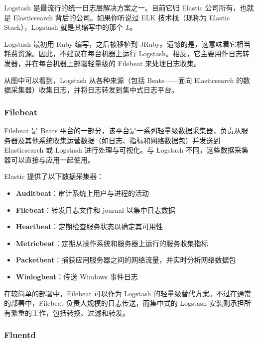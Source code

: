 \label{idx:1854}
\label{idx:1855}
Logstash 是最流行的统一日志层解决方案之一。目前它归 Elastic 公司所有，也就是 Elasticsearch 背后的公司。如果你听说过 ELK 技术栈（现称为 Elastic Stack），Logstash 就是其缩写中的那个 \emph{L}。

Logstash 最初用 Ruby 编写，之后被移植到 JRuby。遗憾的是，这意味着它相当耗费资源。因此，不建议在每台机器上运行 Logstash。相反，它主要用作日志转发器，并在每台机器上部署轻量级的 Filebeat 来处理日志收集。


\label{idx:1856}
\label{idx:1857}
从图中可以看到，Logstash 从各种来源（包括 Beats——面向 Elasticsearch 的数据采集器）收集日志，并将日志转发到集中式日志平台。

\subsubsection{Filebeat}

\label{idx:1858}
\label{idx:1859}
Filebeat 是 Beats 平台的一部分，该平台是一系列轻量级数据采集器，负责从服务器及其他系统收集运营数据（如日志、指标和网络数据包）并发送到 Elasticsearch 或 Logstash 进行处理与可视化。与 Logstash 不同，这些数据采集器可以直接与应用一起使用。

Elastic 提供了以下数据采集器：

\begin{itemize}
\label{idx:1860}
\item \textbf{Auditbeat}：审计系统上用户与进程的活动
\label{idx:1861}
\item \textbf{Filebeat}：转发日志文件和 journal 以集中日志数据
\label{idx:1862}
\item \textbf{Heartbeat}：定期检查服务状态以确定其可用性
\label{idx:1863}
\item \textbf{Metricbeat}：定期从操作系统和服务器上运行的服务收集指标
\label{idx:1864}
\item \textbf{Packetbeat}：捕获应用服务器之间的网络流量，并实时分析网络数据包
\label{idx:1865}
\item \textbf{Winlogbeat}：传送 Windows 事件日志
\end{itemize}

在较简单的部署中，Filebeat 可以作为 Logstash 的轻量级替代方案。不过在通常的部署中，Filebeat 负责大规模的日志传送，而集中式的 Logstash 安装则承担所有繁重的工作，包括转换、过滤和转发。

\subsubsection{Fluentd}


